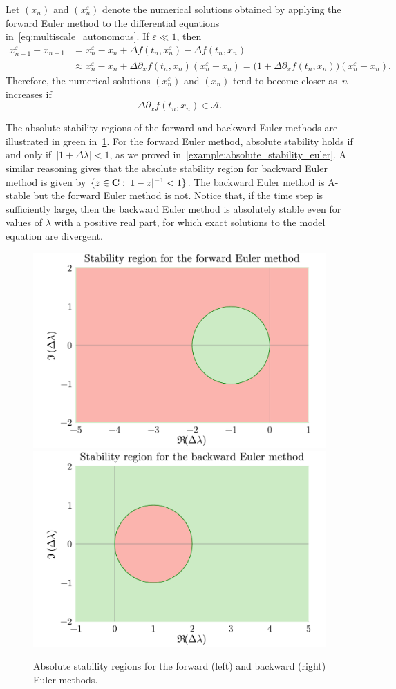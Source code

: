 \begin{example}
    \label{example:perturbed_forward_euler}
    Let $(x_n)$ and $(x_n^{\varepsilon})$ denote the numerical solutions obtained by applying the forward Euler method to the differential equations in~\eqref{eq:multiscale_autonomous}.
    If $\varepsilon \ll 1$,
    then
    \begin{align*}
        x_{n+1}^{\varepsilon} - x_{n+1}
        &= x_{n}^{\varepsilon} - x_{n}
        + \Delta f(t_n, x^{\varepsilon}_n) - \Delta f(t_n, x_n) \\
        &\approx x_{n}^{\varepsilon} - x_{n} + \Delta \partial_x f(t_n, x_n) (x_{n}^{\varepsilon} - x_{n})
        = \bigl(1 + \Delta \partial_x f(t_n, x_n) \bigr) (x_{n}^{\varepsilon} - x_{n}).
    \end{align*}
    Therefore, the numerical solutions $(x^{\varepsilon}_n)$ and $(x_n)$ tend to become closer as~$n$ increases if
    \begin{equation}
        \label{eq:stability_nonlinear}
        \Delta \partial_x f(t_n, x_n) \in \mathcal A.
    \end{equation}
\end{example}

The absolute stability regions of the forward and backward Euler methods are illustrated in green in~\cref{fig:stab_region_euler}.
For the forward Euler method,
absolute stability holds if and only if~$|1 + \Delta \lambda| < 1$,
as we proved in~\cref{example:absolute_stability_euler}.
A similar reasoning gives that the absolute stability region for backward Euler method is given by  $\{z \in \mathbf C : |1 - z|^{-1} < 1\}$.
The backward Euler method is A-stable but the forward Euler method is not.
Notice that, if the time step is sufficiently large,
then the backward Euler method is absolutely stable even for values of $\lambda$ with a positive real part,
for which exact solutions to the model equation are divergent.

\begin{figure}[ht]
    \centering
    \includegraphics[width=0.49\linewidth]{figures/stability_forward Euler.pdf}
    \includegraphics[width=0.49\linewidth]{figures/stability_backward Euler.pdf}
    \caption{Absolute stability regions for the forward (left) and backward (right) Euler methods.}%
    \label{fig:stab_region_euler}
\end{figure}

